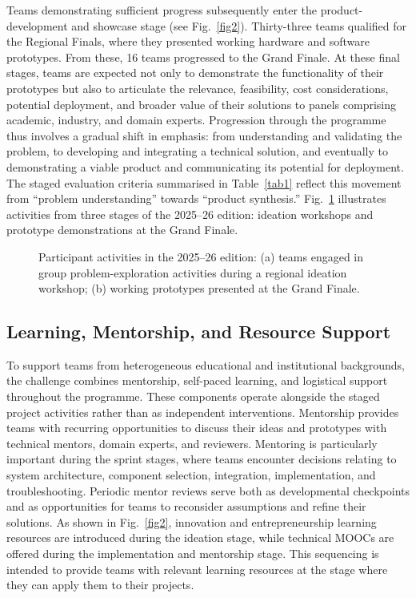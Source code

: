 \documentclass[runningheads]{llncs}
\begin{document}
Teams demonstrating sufficient progress subsequently enter the product-development and showcase stage (see Fig.~\ref{fig2}). Thirty-three teams qualified for the Regional Finals, where they presented working hardware and software prototypes. From these, 16 teams progressed to the Grand Finale. At these final stages, teams are expected not only to demonstrate the functionality of their prototypes but also to articulate the relevance, feasibility, cost considerations, potential deployment, and broader value of their solutions to panels comprising academic, industry, and domain experts. Progression through the programme thus involves a gradual shift in emphasis: from understanding and validating the problem, to developing and integrating a technical solution, and eventually to demonstrating a viable product and communicating its potential for deployment. The staged evaluation criteria summarised in Table~\ref{tab1} reflect this movement from ``problem understanding'' towards ``product synthesis.'' Fig.~\ref{fig3} illustrates activities from three stages of the 2025–26 edition: ideation workshops and prototype demonstrations at the Grand Finale.

\begin{figure}[htbp]
\centering

\caption{Participant activities in the 2025–26 edition: (a) teams engaged in group problem-exploration activities during a regional ideation workshop; (b) working prototypes presented at the Grand Finale.}
\label{fig3}
\end{figure}

\subsection{Learning, Mentorship, and Resource Support}

To support teams from heterogeneous educational and institutional backgrounds, the challenge combines mentorship, self-paced learning, and logistical support throughout the programme. These components operate alongside the staged project activities rather than as independent interventions. Mentorship provides teams with recurring opportunities to discuss their ideas and prototypes with technical mentors, domain experts, and reviewers. Mentoring is particularly important during the sprint stages, where teams encounter decisions relating to system architecture, component selection, integration, implementation, and troubleshooting. Periodic mentor reviews serve both as developmental checkpoints and as opportunities for teams to reconsider assumptions and refine their solutions. As shown in Fig.~\ref{fig2}, innovation and entrepreneurship learning resources are introduced during the ideation stage, while technical MOOCs are offered during the implementation and mentorship stage. This sequencing is intended to provide teams with relevant learning resources at the stage where they can apply them to their projects.
\end{document}
